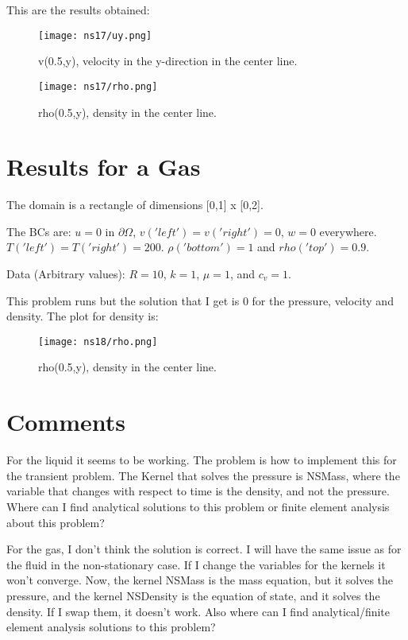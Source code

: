 \documentclass[11pt,letterpaper]{article}
\begin{document}
This are the results obtained:

\begin{figure}[H]
	\centering
	\texttt{[image: ns17/uy.png]}
	\hfill
	\caption{v(0.5,y), velocity in the y-direction in the center line.}
	\label{fig:u}
\end{figure}

\begin{figure}[H]
	\centering
	\texttt{[image: ns17/rho.png]}
	\hfill
	\caption{rho(0.5,y), density in the center line.}
	\label{fig:rho}
\end{figure}

\section{Results for a Gas}
The domain is a rectangle of dimensions [0,1] x [0,2].

The BCs are:
$u = 0$ in $\partial \Omega$, $v('left') = v('right') = 0$, $w = 0$ everywhere.
$T('left')=T('right')=200$.
$\rho('bottom')=1$ and $rho('top')=0.9$.

\noindent
Data (Arbitrary values):
$R = 10$, $k = 1$, $\mu = 1$, and $c_{v}=1$.

This problem runs but the solution that I get is 0 for the pressure, velocity and density.
The plot for density is:
\begin{figure}[H]
	\centering
	\texttt{[image: ns18/rho.png]}
	\hfill
	\caption{rho(0.5,y), density in the center line.}
	\label{fig:rho_g}
\end{figure}

\section{Comments}
For the liquid it seems to be working. The problem is how to implement this for the transient problem. The Kernel that solves the pressure is NSMass, where the variable that changes with respect to time is the density, and not the pressure.
Where can I find analytical solutions to this problem or finite element analysis about this problem?

For the gas, I don't think the solution is correct. I will have the same issue as for the fluid in the non-stationary case.
If I change the variables for the kernels it won't converge. Now, the kernel NSMass is the mass equation, but it solves the pressure, and the kernel NSDensity is the equation of state, and it solves the density. If I swap them, it doesn't work.
Also where can I find analytical/finite element analysis solutions to this problem?

\pagebreak 

\end{document}
